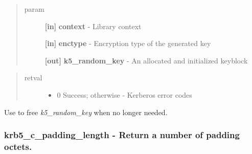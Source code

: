 \documentclass[letterpaper,10pt,english]{sphinxmanual}
\begin{document}
\begin{quote}\begin{description}
\item[{param}] \leavevmode
\textbf{{[}in{]}} \textbf{context} - Library context

\textbf{{[}in{]}} \textbf{enctype} - Encryption type of the generated key

\textbf{{[}out{]}} \textbf{k5\_random\_key} - An allocated and initialized keyblock

\end{description}\end{quote}
\begin{quote}\begin{description}
\item[{retval}] \leavevmode\begin{itemize}
\item {} 
0   Success; otherwise - Kerberos error codes

\end{itemize}

\end{description}\end{quote}

Use {\hyperref[appdev/refs/api/krb5_free_keyblock_contents:krb5_free_keyblock_contents]{}} to free \emph{k5\_random\_key} when no longer needed.


\subsubsection{krb5\_c\_padding\_length -  Return a number of padding octets.}
\label{appdev/refs/api/krb5_c_padding_length:krb5-c-padding-length-return-a-number-of-padding-octets}\label{appdev/refs/api/krb5_c_padding_length::doc}

\begin{fulllineitems}
\label{appdev/refs/api/krb5_c_padding_length:krb5_c_padding_length}
\end{fulllineitems}
\end{document}

